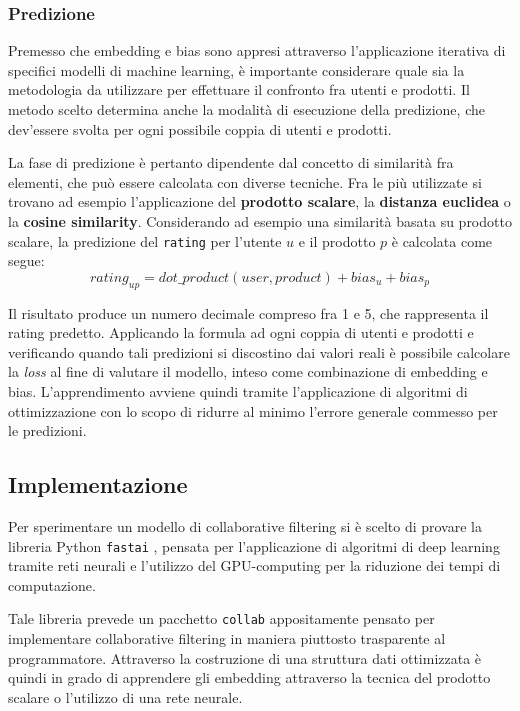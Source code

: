 \documentclass[hidelinks, 12pt]{article}
\begin{document}
\subsubsection{Predizione}

Premesso che embedding e bias sono appresi attraverso l'applicazione iterativa di specifici modelli di machine learning, è importante considerare quale sia la metodologia da utilizzare per effettuare il confronto fra utenti e prodotti. Il metodo scelto determina anche la modalità di esecuzione della predizione, che dev'essere svolta per ogni possibile coppia di utenti e prodotti.

La fase di predizione è pertanto dipendente dal concetto di similarità fra elementi, che può essere calcolata con diverse tecniche. Fra le più utilizzate si trovano ad esempio l'applicazione del \textbf{prodotto scalare}, la \textbf{distanza euclidea} o la \textbf{cosine similarity}. Considerando ad esempio una similarità basata su prodotto scalare, la predizione del \texttt{rating} per l'utente $u$ e il prodotto $p$ è calcolata come segue: 
\[rating_{up} = dot\_product(user, product) + bias_u + bias_p\]

Il risultato produce un numero decimale compreso fra 1 e 5, che rappresenta il rating predetto. Applicando la formula ad ogni coppia di utenti e prodotti e verificando quando tali predizioni si discostino dai valori reali è possibile calcolare la \textit{loss} al fine di valutare il modello, inteso come combinazione di embedding e bias. L'apprendimento avviene quindi tramite l'applicazione di algoritmi di ottimizzazione con lo scopo di ridurre al minimo l'errore generale commesso per le predizioni.



\subsection{Implementazione}

Per sperimentare un modello di collaborative filtering si è scelto di provare la libreria Python \texttt{fastai} \cite{site:fastai}, pensata per l'applicazione di algoritmi di deep learning tramite reti neurali e l'utilizzo del GPU-computing per la riduzione dei tempi di computazione.

Tale libreria prevede un pacchetto \texttt{collab} appositamente pensato per implementare collaborative filtering in maniera piuttosto trasparente al programmatore. Attraverso la costruzione di una struttura dati ottimizzata è quindi in grado di apprendere gli embedding attraverso la tecnica del prodotto scalare o l'utilizzo di una rete neurale.
\end{document}
